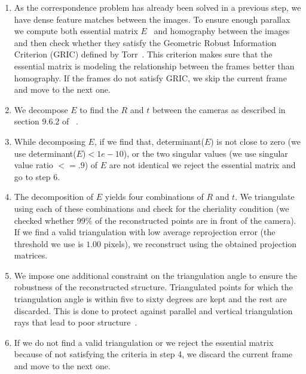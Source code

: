 \begin{enumerate}


\item As the correspondence problem has already been solved in a previous step, we have dense feature matches between the images. To ensure enough parallax we compute both essential matrix $E$~\cite{nister} and homography between the images and then check whether they satisfy the Geometric Robust Information Criterion (GRIC) defined by Torr~\cite{torr1997assessment}. This criterion makes sure that the essential matrix is modeling the relationship between the frames better than homography. If the frames do not satisfy GRIC, we skip the current frame and move to the next one.

\item We decompose $E$ to find the $R$ and $t$ between the cameras as described in section 9.6.2 of ~\cite{hartley2003multiple}.
\item While decomposing $E$, if we find that, determinant($E$) is not
  close to zero (we use determinant($E$)$ < 1e-10$), or the two singular
  values (we use singular value ratio $<=.9$) of $E$ are not identical
  we reject the essential matrix and go to step 6.
\item The decomposition of $E$ yields four combinations of $R$ and $t$. We triangulate using each of these combinations and check for the cheriality condition (we checked whether $99\%$ of the reconstructed points are in front of the camera). If we find a valid triangulation with low average reprojection error (the threshold we use is $1.00$ pixels), we reconstruct using the obtained projection matrices. 

\item We impose one additional constraint on the triangulation angle to ensure the robustness of the reconstructed structure. Triangulated points for which the triangulation angle is within five to sixty degrees are kept and the rest are discarded. This is done to protect against parallel and vertical triangulation rays that lead to poor structure~\cite{parsonage2011efficient}.

\item If we do not find a valid triangulation or we reject the essential matrix because of not satisfying the criteria in step 4, we discard the current frame and move to the next one.

\end{enumerate}

